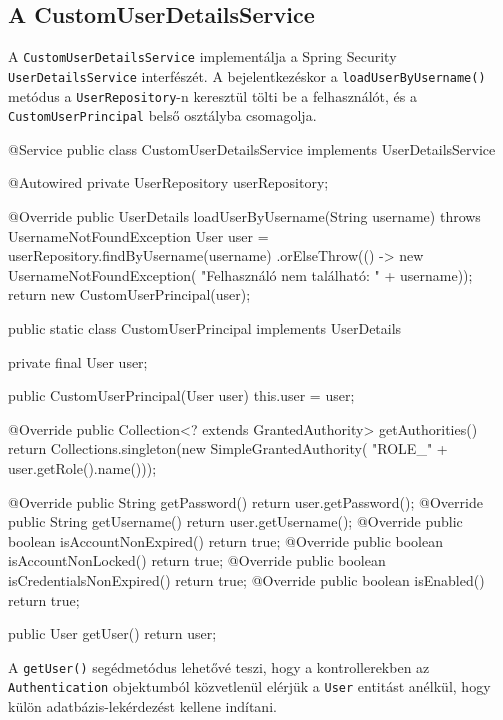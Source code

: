 \subsection{A CustomUserDetailsService}

A \texttt{CustomUserDetailsService} implementálja a Spring Security \texttt{UserDetailsService} interfészét. A bejelentkezéskor a \texttt{loadUserByUsername()} metódus a \texttt{UserRepository}-n keresztül tölti be a felhasználót, és a \texttt{CustomUserPrincipal} belső osztályba csomagolja.

\begin{java}[caption={CustomUserDetailsService és CustomUserPrincipal},label=java:userdetails]
@Service
public class CustomUserDetailsService implements UserDetailsService {

    @Autowired
    private UserRepository userRepository;

    @Override
    public UserDetails loadUserByUsername(String username)
            throws UsernameNotFoundException {
        User user = userRepository.findByUsername(username)
                .orElseThrow(() -> new UsernameNotFoundException(
                        "Felhasználó nem található: " + username));
        return new CustomUserPrincipal(user);
    }

    public static class CustomUserPrincipal implements UserDetails {
        private final User user;

        public CustomUserPrincipal(User user) { this.user = user; }

        @Override
        public Collection<? extends GrantedAuthority> getAuthorities() {
            return Collections.singleton(new SimpleGrantedAuthority(
                    "ROLE_" + user.getRole().name()));
        }

        @Override public String getPassword() { return user.getPassword(); }
        @Override public String getUsername() { return user.getUsername(); }
        @Override public boolean isAccountNonExpired()     { return true; }
        @Override public boolean isAccountNonLocked()      { return true; }
        @Override public boolean isCredentialsNonExpired() { return true; }
        @Override public boolean isEnabled()               { return true; }

        public User getUser() { return user; }
    }
}
\end{java}

A \texttt{getUser()} segédmetódus lehetővé teszi, hogy a kontrollerekben az \texttt{Authentication} objektumból közvetlenül elérjük a \texttt{User} entitást anélkül, hogy külön adatbázis-lekérdezést kellene indítani.

